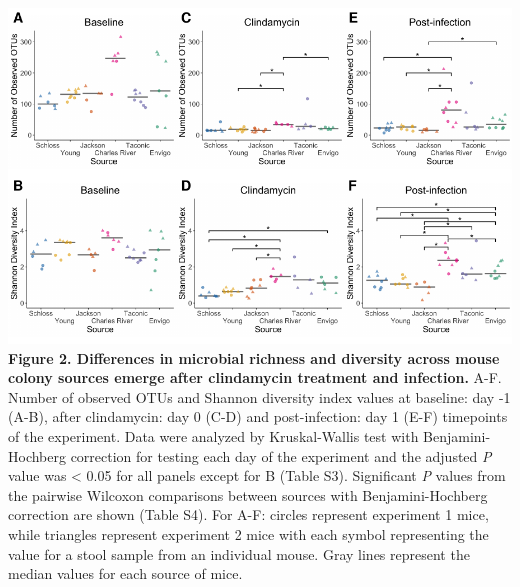 \documentclass[11pt,]{article}
\begin{document}
\includegraphics{figure_2.pdf} \textbf{Figure 2. Differences in
microbial richness and diversity across mouse colony sources emerge
after clindamycin treatment and infection.} A-F. Number of observed OTUs
and Shannon diversity index values at baseline: day -1 (A-B), after
clindamycin: day 0 (C-D) and post-infection: day 1 (E-F) timepoints of
the experiment. Data were analyzed by Kruskal-Wallis test with
Benjamini-Hochberg correction for testing each day of the experiment and
the adjusted \emph{P} value was \textless{} 0.05 for all panels except
for B (Table S3). Significant \emph{P} values from the pairwise Wilcoxon
comparisons between sources with Benjamini-Hochberg correction are shown
(Table S4). For A-F: circles represent experiment 1 mice, while
triangles represent experiment 2 mice with each symbol representing the
value for a stool sample from an individual mouse. Gray lines represent
the median values for each source of mice.

\newpage
\end{document}
